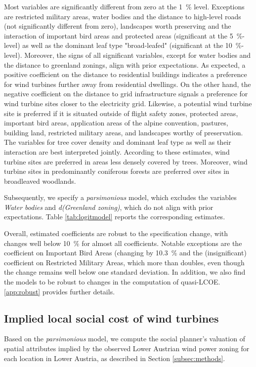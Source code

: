 \documentclass[review, a4paper, 12pt, authoryear, times]{elsarticle}
\begin{document}
Most variables are significantly different from zero at the \SI{1}{\percent} level.
Exceptions are restricted military areas, water bodies and the distance to high-level roads (not significantly different from zero), landscapes worth preserving and the interaction of important bird areas and protected areas (significant at the \SI{5}{\percent}-level) as well as the dominant leaf type "broad-leafed" (significant at the \SI{10}{\percent}-level).
Moreover, the signs of all significant variables, except for water bodies and the distance to greenland zonings, align with prior expectations.
As expected, a positive coefficient on the distance to residential buildings indicates a preference for wind turbines further away from residential dwellings.
On the other hand, the negative coefficient on the distance to grid infrastructure signals a preference for wind turbine sites closer to the electricity grid.
Likewise, a potential wind turbine site is preferred if it is situated outside of flight safety zones, protected areas, important bird areas, application areas of the alpine convention, pastures, building land, restricted military areas, and landscapes worthy of preservation.
The variables for tree cover density and dominant leaf type as well as their interaction are best interpreted jointly. 
According to these estimates, wind turbine sites are preferred in areas less densely covered by trees.
Moreover, wind turbine sites in predominantly coniferous forests are preferred over sites in broadleaved woodlands.

Subsequently, we specify a \emph{parsimonious} model, which excludes the variables \emph{Water bodies} and \emph{d(Greenland zoning)}, which do not align with prior expectations.
Table \ref{tab:logitmodel} reports the corresponding estimates.

Overall, estimated coefficients are robust to the specification change, with changes well below \SI{10}{\percent} for almost all coefficients.
Notable exceptions are the coefficient on Important Bird Areas (changing by \SI{10.3}{\percent} and the (insignificant) coefficient on Restricted Military Areas, which more than doubles, even though the change remains well below one standard deviation.
In addition, we also find the models to be robust to changes in the computation of quasi-LCOE. 
\ref{app:robust} provides further details.

\subsection{Implied local social cost of wind turbines} \label{subsec:wtp}
Based on the \emph{parsimonious} model, we compute the social planner's valuation of spatial attributes implied by the observed Lower Austrian wind power zoning for each location in Lower Austria, as described in Section \ref{subsec:methods}.
\end{document}
